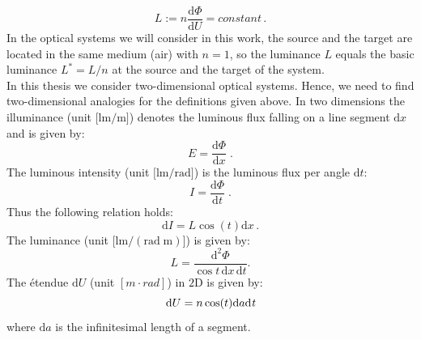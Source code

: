 \begin{equation}\label{basicluminance}
L := n \frac{\textrm{d}\Phi}{\textrm{d}U} = constant\,.
\end{equation}
 In the optical systems we will consider in this work, the source and the target are located in the same medium (air) with $n=1$, so the luminance $L$ equals the basic luminance $L^* = L/n$ at the source and the target of the system.\\
\indent In this thesis we consider two-dimensional optical systems. 
 Hence, we need to find two-dimensional analogies for the definitions given above.
In two dimensions the illuminance \big(unit $\big[\textrm{lm}/\textrm{m}\big]$\big) denotes the luminous flux falling on a line segment $\textrm{d}x$ and is given by:
 \begin{equation}
 E=\frac{\textrm{d}\Phi}{\textrm{d}x}\;.
 \end{equation}
 The luminous intensity \big(unit $\big[\textrm{lm}/\textrm{rad}\big]$\big) is the luminous flux per angle $\textrm{d}t$:
 \begin{equation}
 I=\frac{\textrm{d}\Phi}{\textrm{d}t}\;.
 \end{equation}
 Thus the following relation holds:
 \begin{equation}
 \textrm{d}I = L\cos(t)\textrm{d}x\,.
 \end{equation}
 The luminance \big(unit $\big[\textrm{lm}/(\textrm{rad}\; \textrm{m})\big]$\big) is given by:
 \begin{equation}
 L = \frac{\textrm {d}^2 \Phi}{\cos t\,\textrm{d}x \,\textrm{d}t}.
 \end{equation}
 \indent The \'{e}tendue $\textrm{d}U $ (unit $[m\cdot rad]$) in $2$D is given by:
\begin{equation}\label{etendue2d}
\textrm{d}U = n\cos(t) \textrm{d}a\textrm{d}\textit{t}
\end{equation}
where $\textrm{d}a$ is the infinitesimal length of a segment.
